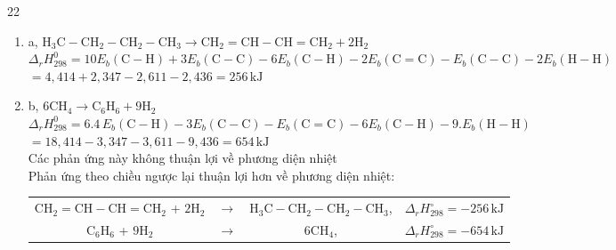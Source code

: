 \begin{loigiaibth}{22}
  \begin {enumerate} \item a, $\mathrm {H_3C-CH_2-CH_2-CH_3 \longrightarrow CH_2=CH-CH=CH_2 + 2H_2}$ \\ $\Delta _rH_{298}^0 = 10E_b(\mathrm {C-H}) + 3E_b(\mathrm {C-C}) - 6E_b(\mathrm {C-H}) - 2E_b(\mathrm {C=C}) - E_b(\mathrm {C-C}) - 2E_b(\mathrm {H-H})$ \\ $= 4{,}414 + 2{,}347 - 2{,}611 - 2{,}436 = 256\,\mathrm {kJ}$ \item b, $6\mathrm {CH_4 \longrightarrow C_6H_6} + 9\mathrm {H_2}$ \\ $\Delta _rH_{298}^0 = 6.4\, E_b(\mathrm {C-H}) - 3E_b(\mathrm {C-C}) - E_b(\mathrm {C=C}) - 6E_b(\mathrm {C-H}) - 9.E_b(\mathrm {H-H})$ \\ $= 18{,}414 - 3{,}347 - 3{,}611 - 9{,}436 = 654\,\mathrm {kJ}$ \\ Các phản ứng này không thuận lợi về phương diện nhiệt \\ Phản ứng theo chiều ngược lại thuận lợi hơn về phương diện nhiệt: \\ \begin {tabular}{cccc} $\mathrm {CH_2=CH-CH=CH_2}$ + $\mathrm {2H_2}$& $\longrightarrow $& $\mathrm {H_3C-CH_2-CH_2-CH_3}$,& $\Delta _rH_{298}^\circ = -256\,\mathrm {kJ}$ \\ $\mathrm {C_6H_6}$ + $\mathrm {9H_2}$ &$\longrightarrow $& $\mathrm {6CH_4}$, &$\Delta _rH_{298}^\circ = -654\,\mathrm {kJ}$ \end {tabular} \end {enumerate}
\end{loigiaibth}
\def\writeANS{}
